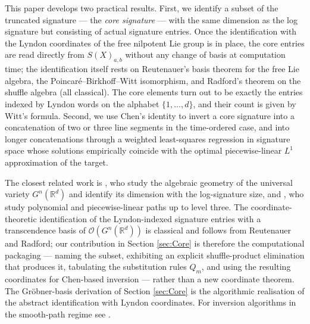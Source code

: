 \documentclass[12pt,english]{article}
\theoremstyle{remark}
\begin{document}
This paper develops two practical results. First, we identify a subset
of the truncated signature --- the \emph{core signature} --- with
the same dimension as the log signature but consisting of actual signature
entries. Once the identification with the Lyndon coordinates of the
free nilpotent Lie group is in place, the core entries are read directly
from $S(X)_{a,b}$ without any change of basis at computation time;
the identification itself rests on Reutenauer's basis theorem for
the free Lie algebra, the Poincaré--Birkhoff--Witt isomorphism, and
Radford's theorem on the shuffle algebra (all classical). The core
elements turn out to be exactly the entries indexed by Lyndon words
on the alphabet $\{1,\ldots,d\}$, and their count is given by Witt's
formula. Second, we use Chen's identity to invert
a core signature into a concatenation of two or three line segments
in the time-ordered case, and into longer concatenations through a
weighted least-squares regression in signature space whose solutions
empirically coincide with the optimal piecewise-linear $L^{1}$ approximation
of the target.

The closest related work is \cite{varieties}, who study the algebraic
geometry of the universal variety $G^{n}(\mathbb{R}^{d})$ and identify
its dimension with the log-signature size, and \cite{learning}, who
study polynomial and piecewise-linear paths up to level three. The
coordinate-theoretic identification of the Lyndon-indexed signature
entries with a transcendence basis of $\mathcal{O}(G^{n}(\mathbb{R}^{d}))$
is classical and follows from Reutenauer and Radford; our contribution
in Section \ref{sec:Core} is therefore the computational packaging
--- naming the subset, exhibiting an explicit shuffle-product elimination
that produces it, tabulating the substitution rules $Q_{m}$, and using
the resulting coordinates for Chen-based inversion --- rather than
a new coordinate theorem. The Gröbner-basis derivation of Section
\ref{sec:Core} is the algorithmic realisation of the abstract identification
with Lyndon coordinates. For inversion algorithms in the smooth-path
regime see \cite{inversion}.
\end{document}
